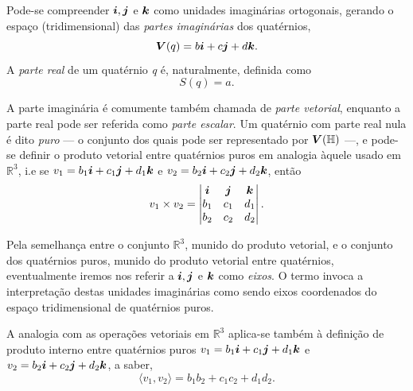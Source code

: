 



Pode-se compreender $\boldsymbol{i}, \boldsymbol{j}$ e $\boldsymbol{k}$ como unidades imagin\'arias ortogonais, gerando o espa\c co (tridimensional) das \emph{partes imagin\'arias} dos quat\'ernios,
\begin{equation}
\boldsymbol{V} (q) = b\boldsymbol{i} + c\boldsymbol{j} + d\boldsymbol{k}.
\end{equation}
A \emph{parte real} de um quat\'ernio \emph{q} \'e, naturalmente, definida como
\begin{equation}
S(q) = a.
\end{equation}

A parte imagin\'aria \'e comumente tamb\'em chamada de \emph{parte vetorial}, enquanto a parte real pode ser referida como \emph{parte escalar}. Um quat\'ernio com parte real nula \'e dito \emph{puro} --- o conjunto dos quais pode ser representado por $\boldsymbol{V}(\mathbb{H})$ ---, e pode-se definir o produto vetorial entre quat\'ernios puros em analogia \`aquele usado em $\mathbb{R}^3$, i.e se $v_1 = b_1\boldsymbol{i} + c_1\boldsymbol{j} + d_1\boldsymbol{k}$ e $v_2 = b_2\boldsymbol{i} + c_2\boldsymbol{j} + d_2\boldsymbol{k}$, ent\~ao
\begin{equation}
v_1 \times v_2 = 
\begin{vmatrix}
\boldsymbol{i} & \boldsymbol{j} & \boldsymbol{k}\\ 
b_1 & c_1 & d_1\\ 
b_2 & c_2 & d_2
\end{vmatrix}.
\end{equation}

Pela semelhan\c ca entre o conjunto $ \mathbb{R}^3 $, munido do produto vetorial, e o conjunto dos quat\'ernios puros, munido do produto vetorial entre quat\'ernios, eventualmente iremos nos referir a $\boldsymbol{i}, \boldsymbol{j}$ e $\boldsymbol{k}$ como \emph{eixos}. O termo invoca a interpreta\c c\~ao destas unidades imagin\'arias como sendo eixos coordenados do espa\c co tridimensional de quat\'ernios puros.

A analogia com as opera\c c\~oes vetoriais em $\mathbb{R}^3$ aplica-se tamb\'em \`a defini\c c\~ao de produto interno entre quat\'ernios puros $v_1 = b_1\boldsymbol{i} + c_1\boldsymbol{j} + d_1\boldsymbol{k}$ e $v_2 = b_2\boldsymbol{i} + c_2\boldsymbol{j} + d_2\boldsymbol{k}$, a saber,
\begin{equation}
\langle v_1, v_2 \rangle =
b_1 b_2 + c_1 c_2 + d_1 d_2.
\end{equation}

